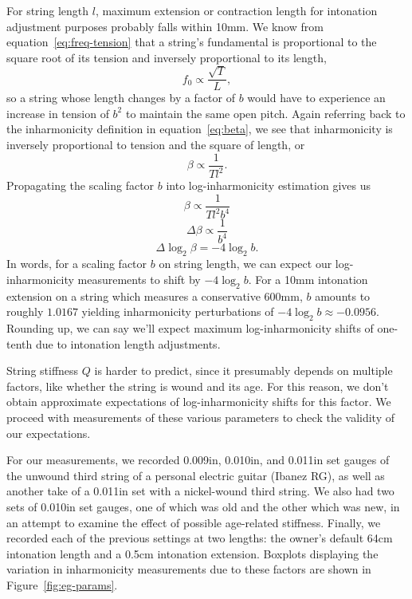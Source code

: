 \documentclass[12pt]{cmuthesis}
\begin{document}
For string length $l$, maximum extension or contraction length for intonation adjustment purposes probably falls within 10mm. We know from equation~\eqref{eq:freq-tension} that a string's fundamental is proportional to the square root of its tension and inversely proportional to its length,
\begin{equation}
f_0 \propto \frac{\sqrt{T}}{L},
\end{equation}
so a string whose length changes by a factor of $b$ would have to experience an increase in tension of $b^2$ to maintain the same open pitch. Again referring back to the inharmonicity definition in equation~\eqref{eq:beta}, we see that inharmonicity is inversely proportional to tension and the square of length, or
\begin{equation}
\beta \propto \frac{1}{Tl^2}.
\end{equation}
Propagating the scaling factor $b$ into log-inharmonicity estimation gives us
\begin{equation}
\beta \propto \frac{1}{Tl^2b^4}
\end{equation}
\begin{equation}
\Delta\beta \propto \frac{1}{b^4}
\end{equation}
\begin{equation}
\Delta\log_2\beta = -4\log_2b.
\end{equation}
In words, for a scaling factor $b$ on string length, we can expect our log-inharmonicity measurements to shift by $-4\log_2b$. For a 10mm intonation extension on a string which measures a conservative 600mm, $b$ amounts to roughly $1.0167$ yielding inharmonicity perturbations of $-4\log_2b \approx -0.0956$. Rounding up, we can say we'll expect maximum log-inharmonicity shifts of one-tenth due to intonation length adjustments.

String stiffness $Q$ is harder to predict, since it presumably depends on multiple factors, like whether the string is wound and its age. For this reason, we don't obtain approximate expectations of log-inharmonicity shifts for this factor. We proceed with measurements of these various parameters to check the validity of our expectations.

For our measurements, we recorded 0.009in, 0.010in, and 0.011in set gauges of the unwound third string of a personal electric guitar (Ibanez RG), as well as another take of a 0.011in set with a nickel-wound third string. We also had two sets of 0.010in set gauges, one of which was old and the other which was new, in an attempt to examine the effect of possible age-related stiffness. Finally, we recorded each of the previous settings at two lengths: the owner's default 64cm intonation length and a 0.5cm intonation extension. Boxplots displaying the variation in inharmonicity measurements due to these factors are shown in Figure~\ref{fig:eg-params}.
\end{document}
